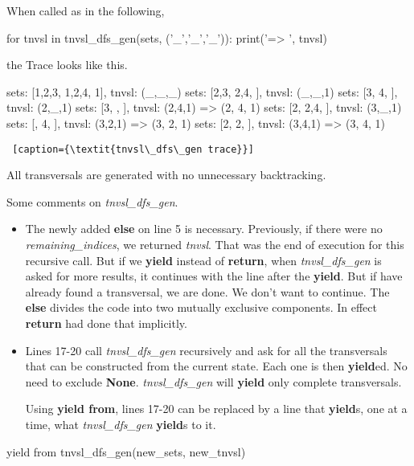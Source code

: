 When called as in the following,

\begin{minipage}[c]{0.45\textwidth}
\begin{python1}  
for tnvsl in tnvsl_dfs_gen(sets, ('_','_','_')):
    print('=> ', tnvsl)
\end{python1}
\end{minipage}

the Trace looks like this.

\begin{minipage}[c]{0.45\textwidth}
\begin{python1}  
sets: [{1,2,3}, {1,2,4}, {1}], tnvsl: (_,_,_)
  sets: [{2,3}, {2,4}, {}], tnvsl: (_,_,1)
    sets: [{3}, {4}, {}], tnvsl: (2,_,1)
      sets: [{3}, {}, {}], tnvsl: (2,4,1)
=>  (2, 4, 1)
    sets: [{2}, {2,4}, {}], tnvsl: (3,_,1)
      sets: [{}, {4}, {}], tnvsl: (3,2,1)
=>  (3, 2, 1)
      sets: [{2}, {2}, {}], tnvsl: (3,4,1)
=>  (3, 4, 1)
\end{python1}\linv
\begin{lstlisting} [caption={\textit{tnvsl\_dfs\_gen trace}}]
\end{lstlisting}
\end{minipage}

All transversals are generated with no unnecessary backtracking.

Some comments on \textit{tnvsl\_dfs\_gen}.
\begin{itemize}
    \item The newly added \textbf{else} on line 5 is necessary. Previously, if there were no \textit{remaining\_indices}, we returned \textit{tnvsl}. That was the end of execution for this recursive call. But if we \textbf{yield} instead of \textbf{return}, when \textit{tnvsl\_dfs\_gen} is asked for more results, it continues with the line after the \textbf{yield}. But if have already found a transversal, we are done. We don't want to continue. The \textbf{else} divides the code into two mutually exclusive components. In effect \textbf{return} had done that implicitly.
    
    \item Lines 17-20 call \textit{tnvsl\_dfs\_gen} recursively and ask for all the transversals that can be constructed from the current state. Each one is then \textbf{yield}ed. No need to exclude \textbf{None}.  \textit{tnvsl\_dfs\_gen} will \textbf{yield} only complete transversals. 
    
    \smallv
Using \textbf{yield from}, lines 17-20 can be replaced by a line that \textbf{yield}s, one at a time, what \textit{tnvsl\_dfs\_gen} \textbf{yield}s to it.
\end{itemize}
\begin{center}
\begin{minipage}[c]{0.45\textwidth}
\begin{python1}
yield from tnvsl_dfs_gen(new_sets, new_tnvsl)
\end{python1}
\end{minipage}   
\end{center}

